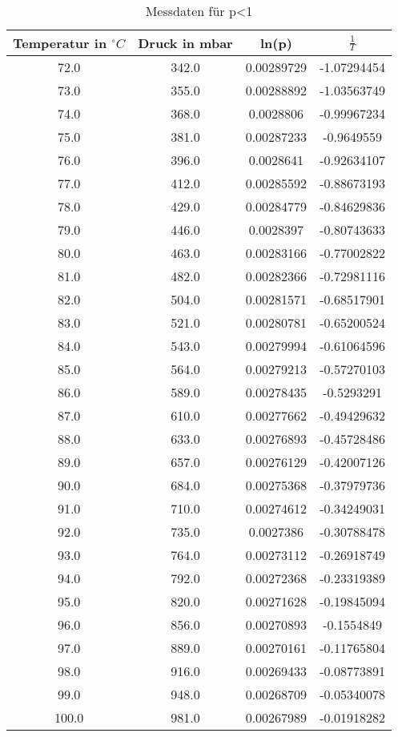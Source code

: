 \documentclass[
  captions=tableheading,
]{scrartcl}
\begin{document}
\begin{table}
  \caption{Messdaten für p<1 }

  \label{tab:Messdaten2}

\begin{tabular}{c c c c}
  \toprule
{Temperatur in $^\circ C$}& {Druck in mbar}&{ln(p)}&{$\frac{1}{T}$}\\

 \midrule
72.0    &    342.0   &    0.00289729    &    -1.07294454\\
73.0    &    355.0   &    0.00288892    &    -1.03563749\\
74.0    &    368.0   &    0.0028806     &    -0.99967234\\
75.0    &    381.0   &    0.00287233    &    -0.9649559\\
76.0    &    396.0   &    0.0028641     &    -0.92634107\\
77.0    &    412.0   &    0.00285592    &    -0.88673193\\
78.0    &    429.0   &    0.00284779    &    -0.84629836\\
79.0    &    446.0   &    0.0028397     &    -0.80743633\\
80.0    &    463.0   &    0.00283166    &    -0.77002822\\
81.0    &    482.0   &    0.00282366    &    -0.72981116\\
82.0    &    504.0   &    0.00281571    &    -0.68517901\\
83.0    &    521.0   &    0.00280781    &    -0.65200524\\
84.0    &    543.0   &    0.00279994    &    -0.61064596\\
85.0    &    564.0   &    0.00279213    &    -0.57270103\\
86.0    &    589.0   &    0.00278435    &    -0.5293291\\
87.0    &    610.0   &    0.00277662    &    -0.49429632\\
88.0    &    633.0   &    0.00276893    &    -0.45728486\\
89.0    &    657.0   &    0.00276129    &    -0.42007126\\
90.0    &    684.0   &    0.00275368    &    -0.37979736\\
91.0    &    710.0   &    0.00274612    &    -0.34249031\\
92.0    &    735.0   &    0.0027386     &    -0.30788478\\
93.0    &    764.0   &    0.00273112    &    -0.26918749\\
94.0    &    792.0   &    0.00272368    &    -0.23319389\\
95.0    &    820.0   &    0.00271628    &    -0.19845094\\
96.0    &    856.0   &    0.00270893    &    -0.1554849\\
97.0    &    889.0   &    0.00270161    &    -0.11765804\\
98.0    &    916.0   &    0.00269433    &    -0.08773891\\
99.0    &    948.0   &    0.00268709    &    -0.05340078\\
100.0   &    981.0   &    0.00267989    &    -0.01918282\\

\end{tabular}
\end{table}
\end{document}
